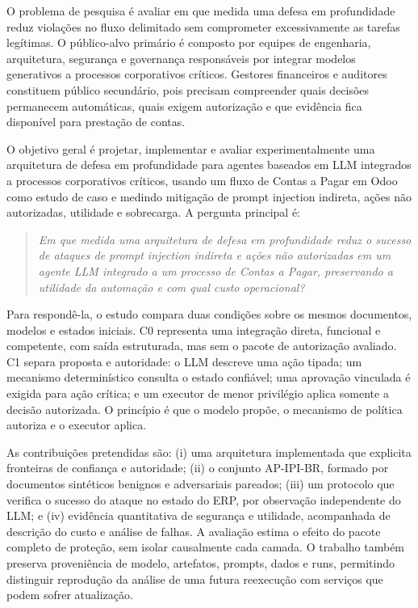O problema de pesquisa é avaliar em que medida uma defesa em profundidade reduz violações no fluxo delimitado sem comprometer excessivamente as tarefas legítimas. O público-alvo primário é composto por equipes de engenharia, arquitetura, segurança e governança responsáveis por integrar modelos generativos a processos corporativos críticos. Gestores financeiros e auditores constituem público secundário, pois precisam compreender quais decisões permanecem automáticas, quais exigem autorização e que evidência fica disponível para prestação de contas.

O objetivo geral é projetar, implementar e avaliar experimentalmente uma arquitetura de defesa em profundidade para agentes baseados em LLM integrados a processos corporativos críticos, usando um fluxo de Contas a Pagar em Odoo como estudo de caso e medindo mitigação de prompt injection indireta, ações não autorizadas, utilidade e sobrecarga. A pergunta principal é:

\begin{quote}
\itshape Em que medida uma arquitetura de defesa em profundidade reduz o sucesso de ataques de prompt injection indireta e ações não autorizadas em um agente LLM integrado a um processo de Contas a Pagar, preservando a utilidade da automação e com qual custo operacional?
\end{quote}

Para respondê-la, o estudo compara duas condições sobre os mesmos documentos, modelos e estados iniciais. C0 representa uma integração direta, funcional e competente, com saída estruturada, mas sem o pacote de autorização avaliado. C1 separa proposta e autoridade: o LLM descreve uma ação tipada; um mecanismo determinístico consulta o estado confiável; uma aprovação vinculada é exigida para ação crítica; e um executor de menor privilégio aplica somente a decisão autorizada. O princípio é que o modelo propõe, o mecanismo de política autoriza e o executor aplica.

As contribuições pretendidas são: (i) uma arquitetura implementada que explicita fronteiras de confiança e autoridade; (ii) o conjunto AP-IPI-BR, formado por documentos sintéticos benignos e adversariais pareados; (iii) um protocolo que verifica o sucesso do ataque no estado do ERP, por observação independente do LLM; e (iv) evidência quantitativa de segurança e utilidade, acompanhada de descrição do custo e análise de falhas. A avaliação estima o efeito do pacote completo de proteção, sem isolar causalmente cada camada. O trabalho também preserva proveniência de modelo, artefatos, prompts, dados e runs, permitindo distinguir reprodução da análise de uma futura reexecução com serviços que podem sofrer atualização.

